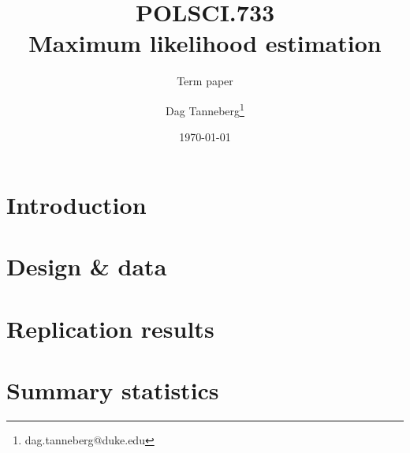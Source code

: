 \documentclass[parskip=half]{scrartcl}\usepackage[]{graphicx}\usepackage[]{color}
\title{POLSCI.733\\Maximum likelihood estimation}
\subtitle{Term paper}
\author{Dag Tanneberg\thanks{%
    dag.tanneberg@duke.edu
  }
}
\date{\today}
\begin{document}
 
\linenumbers

\maketitle
\thispagestyle{empty}
\tableofcontents
\newpage

\section{Introduction}








\section{Design \& data}






\section{Replication results}


\newpage
\appendix
\section{Summary statistics}




\newpage
{}
\printbibliography
\end{document}
